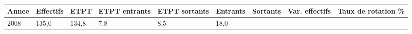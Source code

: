 \begin{longtable}[]{@{}lllllllll@{}}
\toprule
\begin{minipage}[b]{0.05\columnwidth}\raggedright
Annee\strut
\end{minipage} & \begin{minipage}[b]{0.08\columnwidth}\raggedright
Effectifs\strut
\end{minipage} & \begin{minipage}[b]{0.05\columnwidth}\raggedright
ETPT\strut
\end{minipage} & \begin{minipage}[b]{0.10\columnwidth}\raggedright
ETPT entrants\strut
\end{minipage} & \begin{minipage}[b]{0.10\columnwidth}\raggedright
ETPT sortants\strut
\end{minipage} & \begin{minipage}[b]{0.07\columnwidth}\raggedright
Entrants\strut
\end{minipage} & \begin{minipage}[b]{0.07\columnwidth}\raggedright
Sortants\strut
\end{minipage} & \begin{minipage}[b]{0.11\columnwidth}\raggedright
Var. effectifs\strut
\end{minipage} & \begin{minipage}[b]{0.14\columnwidth}\raggedright
Taux de rotation \%\strut
\end{minipage}\tabularnewline
\midrule
\endhead
\begin{minipage}[t]{0.05\columnwidth}\raggedright
2008\strut
\end{minipage} & \begin{minipage}[t]{0.08\columnwidth}\raggedright
135,0\strut
\end{minipage} & \begin{minipage}[t]{0.05\columnwidth}\raggedright
134,8\strut
\end{minipage} & \begin{minipage}[t]{0.10\columnwidth}\raggedright
7,8\strut
\end{minipage} & \begin{minipage}[t]{0.10\columnwidth}\raggedright
8,5\strut
\end{minipage} & \begin{minipage}[t]{0.07\columnwidth}\raggedright
18,0\strut
\end{minipage} & \begin{minipage}[t]{0.07\columnwidth}\raggedright

\end{minipage}
\end{longtable}

